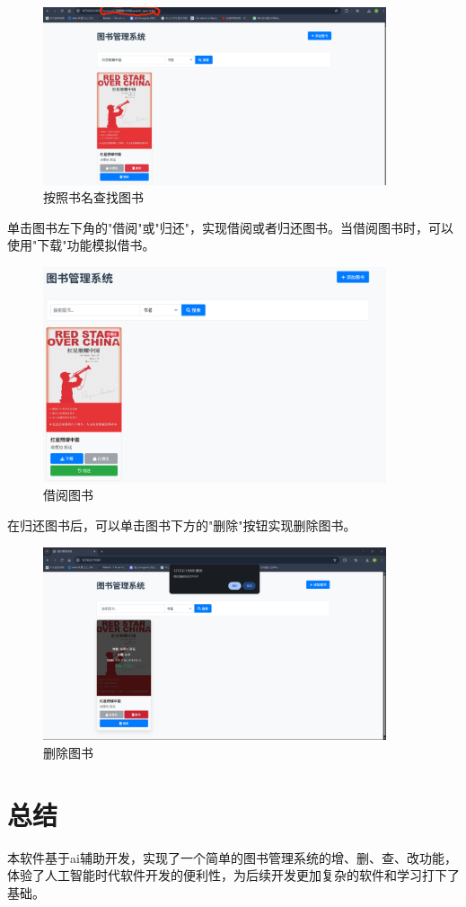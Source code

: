 \documentclass{SYSUReport}
\begin{document}
\begin{figure}[H]
    \centering
    \includegraphics[width=0.9\textwidth]{figures/search_name.png}
    \caption{按照书名查找图书}
    \label{fig:flow}
\end{figure}

单击图书左下角的"借阅"或"归还"，实现借阅或者归还图书。当借阅图书时，可以使用"下载"功能模拟借书。

\begin{figure}[H]
    \centering
    \includegraphics[width=0.9\textwidth]{figures/after_loan.png}
    \caption{借阅图书}
    \label{fig:flow}
\end{figure}

在归还图书后，可以单击图书下方的"删除"按钮实现删除图书。

\begin{figure}[H]
    \centering
    \includegraphics[width=0.9\textwidth]{figures/delete_book.png}
    \caption{删除图书}
    \label{fig:flow}
\end{figure}

\section{总结}

本软件基于ai辅助开发，实现了一个简单的图书管理系统的增、删、查、改功能，体验了人工智能时代软件开发的便利性，为后续开发更加复杂的软件和学习打下了基础。
\end{document}

